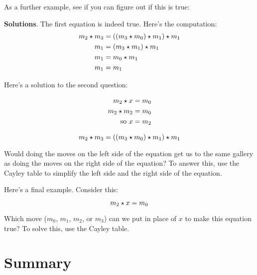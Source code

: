 \documentclass[../../../main.tex]{subfiles}
\begin{document}
\begin{example}

As a further example, see if you can figure out if this is true:

\begin{aside}
  \textbf{Solutions}. The first equation is indeed true. Here's the computation:
    \begin{align*}
      m_{2} \opSymbol/ m_{3} &= ((m_{3} \opSymbol/ m_{0}) \opSymbol/ m_{1}) \opSymbol/ m_{1} \\
      m_{1} &= (m_{3} \opSymbol/ m_{1}) \opSymbol/ m_{1} \\
      m_{1} &= m_{0} \opSymbol/ m_{1} \\
      m_{1} &= m_{1}
    \end{align*}
    
    Here's a solution to the second question:
    
    \begin{align*}
      m_{2} \opSymbol/ x &= m_{0} \\
      m_{2} \opSymbol/ m_{2} &= m_{0} \\
      \text{ so } x &= m_{2}
    \end{align*}
\end{aside}
    
\begin{equation*}
  m_{2} \opSymbol/ m_{3} = ((m_{3} \opSymbol/ m_{0}) \opSymbol/ m_{1}) \opSymbol/ m_{1}
\end{equation*}
    
Would doing the moves on the left side of the equation get us to the same gallery as doing the moves on the right side of the equation? To answer this, use the Cayley table to simplify the left side and the right side of the equation.

Here's a final example. Consider this:

\begin{equation*}
  m_{2} \opSymbol/ x = m_{0}
\end{equation*}

Which move ($m_{0}$, $m_{1}$, $m_{2}$, or $m_{3}$) can we put in place of $x$ to make this equation true? To solve this, use the Cayley table.

\end{example}

\section{Summary}
\end{document}
